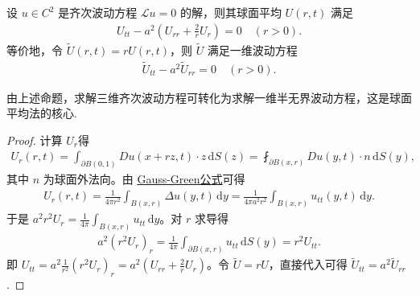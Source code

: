 \documentclass[../../main.tex]{subfiles}%
\begin{document}
\begin{proposition}\label{proposition:球面平均满足一维波动方程}
设 $u\in C^2$ 是齐次波动方程 $\mathcal{L}u=0$ 的解，则其球面平均 $U(r,t)$ 满足
\begin{align}
U_{tt}-a^2\left(U_{rr}+\frac{2}{r}U_r\right)=0 \quad (r>0). \label{eq:spherical-wave}
\end{align}
等价地，令 $\widetilde{U}(r,t)=rU(r,t)$，则 $\widetilde{U}$ 满足一维波动方程
\begin{align}
\widetilde{U}_{tt}-a^2\widetilde{U}_{rr}=0 \quad (r>0). \label{eq:reduced-wave}
\end{align}
\end{proposition}
\begin{remark}
由上述命题，求解三维齐次波动方程可转化为求解一维半无界波动方程，这是球面平均法的核心.
\end{remark}
\begin{proof}
计算 $U_r$得
\begin{align*}
U_r(r,t)=\int_{\partial B(0,1)} Du(x+rz,t)\cdot z\,\mathrm{d}S(z)
=\fint_{\partial B(x,r)} Du(y,t)\cdot n\,\mathrm{d}S(y),
\end{align*}
其中 $n$ 为球面外法向。由 \hyperref[Basis of Analytics-theorem:Gauss-Green公式(散度定理)]{Gauss-Green公式}可得
\begin{align*}
U_r(r,t)=\frac{1}{4\pi r^2}\int_{B(x,r)}\Delta u(y,t)\,\mathrm{d}y
=\frac{1}{4\pi a^2r^2}\int_{B(x,r)}u_{tt}(y,t)\,\mathrm{d}y.
\end{align*}
于是 $a^2r^2U_r=\frac{1}{4\pi}\int_{B(x,r)}u_{tt}\,\mathrm{d}y$。对 $r$ 求导得
\begin{align*}
a^2(r^2U_r)_r=\frac{1}{4\pi}\int_{\partial B(x,r)}u_{tt}\,\mathrm{d}S(y)=r^2U_{tt}.
\end{align*}
即 $U_{tt}=a^2\frac{1}{r^2}(r^2U_r)_r=a^2(U_{rr}+\frac{2}{r}U_r)$。令 $\widetilde{U}=rU$，直接代入可得 $\widetilde{U}_{tt}=a^2\widetilde{U}_{rr}$.
\end{proof}
\end{document}

